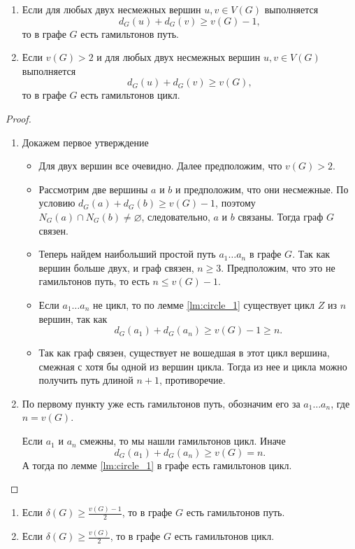 \begin{theorem}
	\begin{enumerate}
		\item Если для любых двух несмежных вершин $u, v \in V(G)$ выполняется 
			\[
			d_G(u) + d_{G}(v) \ge v(G) - 1
			,\] 
			то в графе $G$ есть гамильтонов путь.
		\item Если  $v(G) > 2$ и для любых двух несмежных вершин  $u, v \in V(G)$ выполняется
			\[
			d_{G}(u) + d_{G}(v) \ge v(G)
			,\] 
			то в графе $G$ есть гамильтонов цикл.
	\end{enumerate}
\end{theorem}
\begin{proof}
\begin{enumerate}
	\item Докажем первое утверждение
	\begin{itemize}
	\item Для двух вершин все очевидно. Далее предположим, что  $v(G) > 2$.
	\item Рассмотрим две вершины $a$ и $b$ и  предположим, что они несмежные. По условию $d_G(a)+ d_{G}(b) \ge v(G) -1 $, поэтому $N_G(a) \cap N_G(b) \neq \varnothing$, следовательно, $a$ и $b$ связаны. Тогда граф $G$ связен.
	\item Теперь найдем наибольший простой путь $a_1\ldots a_{n}$ в графе $G$. Так как вершин больше двух, и граф связен, $n \ge 3$. Предположим, что это не гамильтонов путь, то есть $n \le v(G) - 1$.
	\item Если $a_1\ldots a_{n}$ не цикл, то по лемме \ref{lm:circle_1} существует цикл $Z$ из $n$ вершин, так как 
		\[
		d_G(a_1) + d_G(a_{n}) \ge v(G) - 1 \ge n
		.\] 
	\item Так как граф связен, существует не вошедшая в этот цикл вершина, смежная с хотя бы одной из вершин цикла. Тогда из нее и цикла можно получить путь длиной $n+1$, противоречие.
	\end{itemize}
\item По первому пункту уже есть гамильтонов путь, обозначим его за $a_1\ldots a_{n}$, где $n = v(G)$.

	Если $a_1$ и $a_n$ смежны, то мы нашли гамильтонов цикл. Иначе
	\[
	d_G(a_1) + d_G(a_{n}) \ge v(G) = n
	.\] 
	А тогда по лемме \ref{lm:circle_1} в графе есть гамильтонов цикл.
\end{enumerate}    
\end{proof}

\begin{corollary}
	\begin{enumerate}
		\item Если $\delta(G) \ge \frac{v(G)-1}{2}$, то в графе $G$ есть гамильтонов путь.
		\item  Если $\delta(G) \ge \frac{v(G)}{2}$, то в графе $G$ есть гамильтонов цикл.
	\end{enumerate}
\end{corollary}
